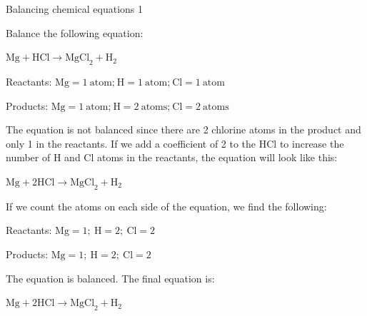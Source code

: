\begin{wex}{Balancing chemical equations 1}{Balance the following equation:
\begin{center}
${\text{Mg} + \text{HCl} \rightarrow \text{MgCl}_{2} + \text{H}_{2}}$\\
\end{center}
}

{

Reactants: $\text{Mg} = 1 ~\text{atom;}~ \text{H} = 1 ~\text{atom;}~ \text{Cl} = 1 ~\text{atom}$

Products: $\text{Mg} = 1 ~\text{atom;}~ \text{H} = 2 ~\text{atoms;}~ \text{Cl} = 2 ~\text{atoms}$}

{
The equation is not balanced since there are 2 chlorine atoms in the product and only 1 in the reactants. If we add a coefficient of 2 to the HCl to increase the number of H and Cl atoms in the reactants, the equation will look like this:
\begin{center}
${\text{Mg} + 2\text{HCl} \rightarrow \text{MgCl}_{2} + \text{H}_{2}}$\\
\end{center}
}

{
If we count the atoms on each side of the equation, we find the following:

Reactants: $\text{Mg} = 1;~ \text{H} = 2;~ \text{Cl} = 2$

Products: $\text{Mg} = 1;~ \text{H} = 2;~ \text{Cl} = 2$

The equation is balanced. The final equation is:
\begin{center}
${\text{Mg} + 2\text{HCl} \rightarrow \text{MgCl}_{2} + \text{H}_{2}}$
\end{center}
}
\end{wex}
    \noindent
\par
            \label{m38726*secfhsst!!!underscore!!!id394}
      \noindent
